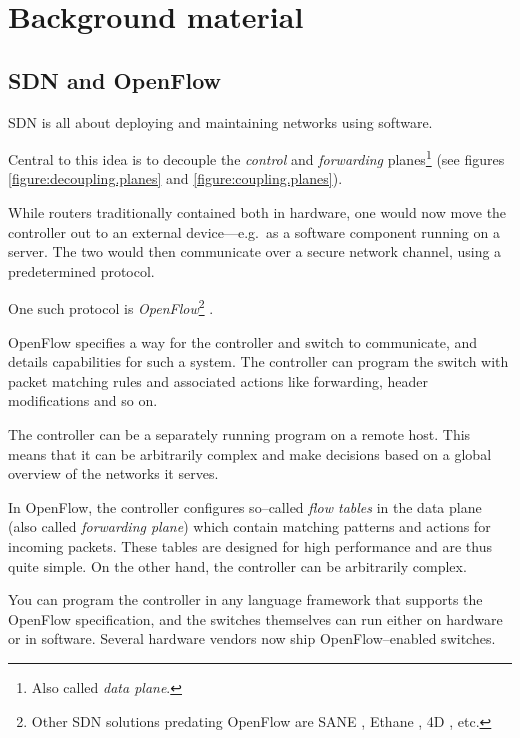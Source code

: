 \chapter{Background material}
\label{chapter:background}

\section{SDN and OpenFlow}
\label{chapter:background.openflow}

\acf{SDN} is all about deploying and maintaining networks using software.

Central to this idea is to decouple the \textit{control} and
\textit{forwarding} planes\footnote{Also called \textit{data plane}.}
(see figures \ref{figure:decoupling.planes} and \ref{figure:coupling.planes}).

While routers traditionally contained both in hardware, one would now move
the controller out to an external device---e.g.~as a software component
running on a server.  The two would then communicate over a secure network
channel, using a predetermined protocol.

One such protocol is {\em OpenFlow}\footnote{Other
\ac{SDN} solutions predating OpenFlow are SANE
\cite{Casado:2006:SPA:1267336.1267346}, Ethane
\cite{Casado:2007:ETC:1282427.1282382}, 4D
\cite{Greenberg:2005:CSA:1096536.1096541}, etc.}
\cite{McKeown:2008:OEI:1355734.1355746}. 

OpenFlow specifies a way for the controller and switch to communicate, and
details capabilities for such a system.
The controller can program the switch with packet matching rules
and associated actions like forwarding, header modifications and so on.

The controller can be a separately running program on a remote host. This
means that it can be arbitrarily complex and make decisions based on a
global overview of the networks it serves.

In OpenFlow, the controller configures so--called {\em flow tables} in the
data plane (also called \textit{forwarding plane})
   which contain matching patterns and actions
for incoming packets.  These tables are designed for high performance
and are thus quite simple.  On the other hand, the controller can be
arbitrarily complex.

You can program the controller in any language framework that supports the
OpenFlow specification, and the switches themselves can run either on
hardware or in software.  Several hardware vendors now ship
OpenFlow--enabled switches.

